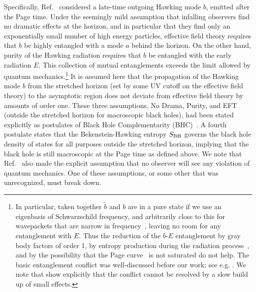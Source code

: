 \documentclass[12pt]{article}
\begin{document}
Specifically, Ref.~\cite{Almheiri:2012rt} considered a late-time outgoing Hawking mode $b$, emitted after the Page time.  Under the seemingly mild assumption that infalling observers find no dramatic effects at the horizon, and in particular that they find only an exponentially small number of high energy particles, effective field theory requires that $b$ be highly entangled with a mode $a$ behind the horizon.  On the other hand, purity of the Hawking radiation requires that $b$ be entangled with the early radiation $E$.  This collection of mutual entanglements exceeds the limit allowed by quantum mechanics.\footnote{\label{GBfootnote}In particular, {taken together} {$\tilde{b}$ and $b$} are {in a pure state} {if we use} an eigenbasis of Schwarzschild frequency, and arbitrarily close to this for wavepackets that are narrow in frequency~\cite{Giddings:1992ff}, leaving no room for any entanglement with $E$.  Thus  the reduction of the {$b$-$E$ entanglement} by gray body factors {of order 1}, by entropy production during the radiation process~\cite{Page:1976ki,Zurek:1982zz,Verlinde:2012cy}, and by the possibility that the Page curve~\cite{Page:1993df} is not saturated do not help.  The basic entanglement conflict was well-discussed before our work; see e.g. \cite{Sorkin:1997ja,Mathur:2009hf,Braunstein:2009my,Giddings:2012dh}.  We note that  \cite{Mathur:2009hf,Giddings:2012dh} show explicitly that the conflict cannot be resolved by a slow build up of small effects.} It is assumed here that the propagation of the Hawking mode $b$ from the stretched horizon (set by some UV cutoff on the effective field theory) to the asymptotic region does not deviate from effective field theory by amounts of order one.  These three assumptions, No Drama, Purity, and EFT (outside the stretched horizon for macroscopic black holes), had been stated explicitly as postulates of Black Hole Complementarity (BHC)~\cite{Susskind:1993if}.  A fourth postulate states that the Bekenstein-Hawking entropy $S_{\rm BH}$ governs the black hole density of states for all purposes outside the stretched horizon, implying that the black hole is still macroscopic at the Page time as defined above.  We note that Ref.~\cite{Almheiri:2012rt} also made the explicit assumption that no observer will see any violation of quantum mechanics.  One of these assumptions, or some other that was unrecognized, must break down.
\end{document}
